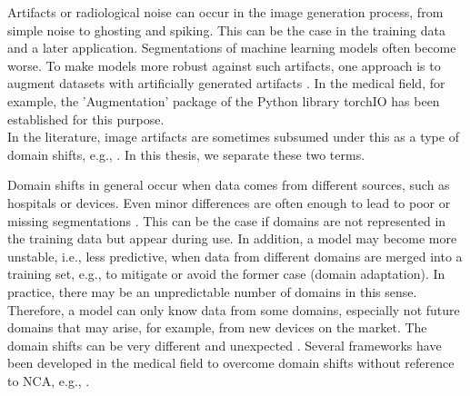 Artifacts or radiological noise can occur in the image generation process, from simple noise to ghosting and spiking. This can be the case in the training data and a later application. Segmentations of machine learning models often become worse. To make models more robust against such artifacts, one approach is to augment datasets with artificially generated artifacts \cite{Zhou:2023:DomainGeneralization_alsoAugmentation}. In the medical field, for example, the 'Augmentation' package of the Python library torchIO \cite{torchIO} has been established for this purpose.\\
In the literature, image artifacts are sometimes subsumed under this as a type of domain shifts, e.g., \cite{Zhou:2023:DomainGeneralization_alsoAugmentation}. In this thesis, we separate these two terms.


Domain shifts in general \cite{Zhou:2023:DomainGeneralization_alsoAugmentation} occur when data comes from different sources, such as hospitals or devices. Even minor differences are often enough to lead to poor or missing segmentations \cite{Baum:2023:medDomainShifts}. This can be the case if domains are not represented in the training data but appear during use. In addition, a model may become more unstable, i.e., less predictive, when data from different domains are merged into a training set, e.g., to mitigate or avoid the former case (domain adaptation). In practice, there may be an unpredictable number of domains in this sense. Therefore, a model can only know data from some domains, especially not future domains that may arise, for example, from new devices on the market. The domain shifts can be very different and unexpected \cite{Yan:2019:DomainShiftsInMedSeg, kondrateva:2020:domainShifts}. Several frameworks have been developed in the medical field to overcome domain shifts without reference to NCA, e.g., \cite{Baum:2023:medDomainShifts, Saunders:2021:DataLimitedprostSeg, Liu:2020:MS-Net:RobustProstSegmentation}.